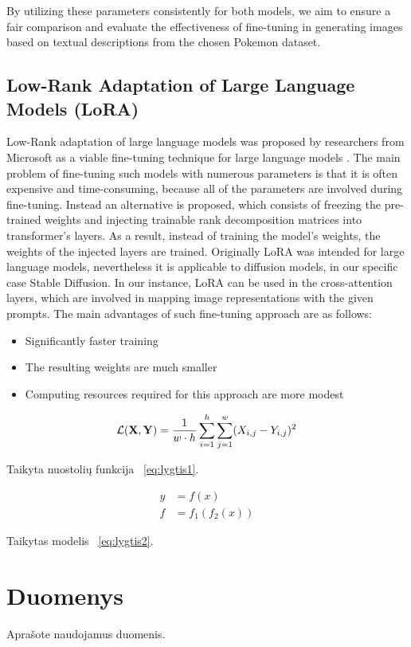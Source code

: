 \documentclass[conference]{IEEEtran}
\begin{document}
By utilizing these parameters consistently for both models, we aim to ensure a fair comparison and evaluate the effectiveness of fine-tuning in generating images based on textual descriptions from the chosen Pokemon dataset.

\subsection{Low-Rank Adaptation of Large Language Models (LoRA)}
Low-Rank adaptation of large language models was proposed by researchers from Microsoft as a viable fine-tuning technique for large language models \cite{hu2021lora}. The main problem of fine-tuning such models with numerous parameters is that it is often expensive and time-consuming, because all of the parameters are involved during fine-tuning. Instead an alternative is proposed, which consists of freezing the pre-trained weights and injecting trainable rank decomposition matrices into transformer's layers. As a result, instead of training the model's weights, the weights of the injected layers are trained. Originally LoRA was intended for large language models, nevertheless it is applicable to diffusion models, in our specific case Stable Diffusion. In our instance, LoRA can be used in the cross-attention layers, which are involved in mapping image representations with the given prompts. The main advantages of such fine-tuning approach are as follows:
\begin{itemize}
\item Significantly faster training
\item The resulting weights are much smaller
\item Computing resources required for this approach are more modest
\end{itemize}

\begin{equation}
\mathcal{L}({\bf X}, {\bf Y}) = \frac{1}{w \cdot h} \sum_{i=1}^h \sum_{j=1}^w (X_{i, j} - Y_{i, j})^2
\label{eq:lygtis1}
\end{equation}

Taikyta nuostolių funkcija ~\eqref{eq:lygtis1}.

\begin{align}
y & = f(x) \nonumber \\
f & = f_1(f_2(x))
\label{eq:lygtis2}
\end{align}

Taikytas modelis ~\eqref{eq:lygtis2}.


\section{Duomenys}
Aprašote naudojamus duomenis.
\end{document}
